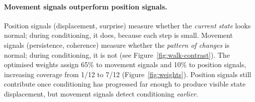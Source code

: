 \documentclass[10pt,twocolumn]{article}
\begin{document}
\paragraph{Movement signals outperform position signals.}  Position
signals (displacement, surprise) measure whether the \emph{current state}
looks normal; during conditioning, it does, because each step is small.
Movement signals (persistence, coherence) measure whether the
\emph{pattern of changes} is normal; during conditioning, it is not
(see Figure~\ref{fig:walk-contrast}).
The optimised weights assign 65\% to movement signals and 10\% to
position signals, increasing coverage from 1/12 to 7/12
(Figure~\ref{fig:weights}).  Position signals still contribute once
conditioning has progressed far enough to produce visible state
displacement, but movement signals detect conditioning
\emph{earlier}.
\end{document}
